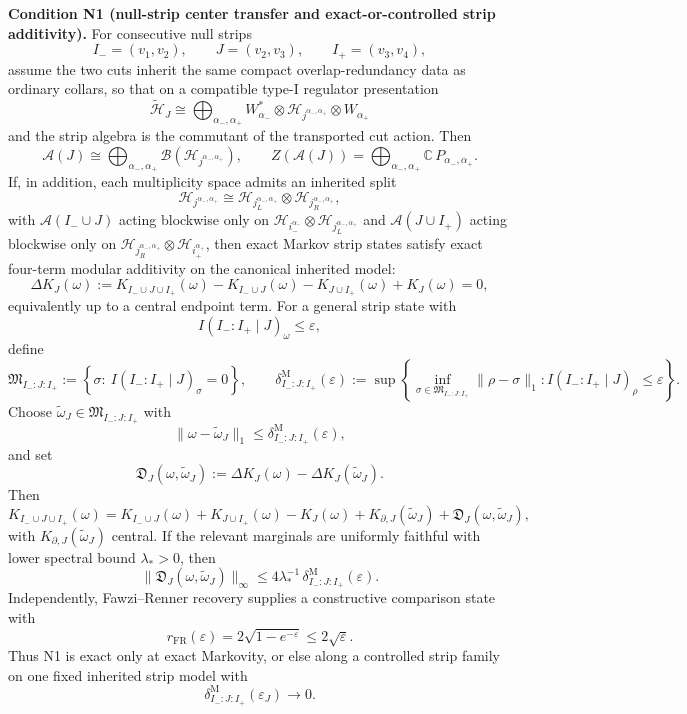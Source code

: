 \textbf{Condition N1 (null-strip center transfer and exact-or-controlled strip additivity).} For consecutive null strips
\[
I_-=(v_1,v_2),\qquad
J=(v_2,v_3),\qquad
I_+=(v_3,v_4),
\]
assume the two cuts inherit the same compact overlap-redundancy data as ordinary collars, so that on a compatible type-I regulator presentation
\[
\tilde{\mathcal H}_{J}
\cong
\bigoplus_{\alpha_-,\alpha_+}
W_{\alpha_-}^{*}\otimes
\mathcal H_{j^{\alpha_-,\alpha_+}}\otimes
W_{\alpha_+}
\]
and the strip algebra is the commutant of the transported cut action. Then
\[
\mathcal A(J)
\cong
\bigoplus_{\alpha_-,\alpha_+}
\mathcal B(\mathcal H_{j^{\alpha_-,\alpha_+}}),
\qquad
Z(\mathcal A(J))
=
\bigoplus_{\alpha_-,\alpha_+}\mathbb C\,P_{\alpha_-,\alpha_+}.
\]
If, in addition, each multiplicity space admits an inherited split
\[
\mathcal H_{j^{\alpha_-,\alpha_+}}
\cong
\mathcal H_{j_L^{\alpha_-,\alpha_+}}
\otimes
\mathcal H_{j_R^{\alpha_-,\alpha_+}},
\]
with \(\mathcal A(I_-\cup J)\) acting blockwise only on
\(\mathcal H_{i_-^{\alpha_-}}\otimes \mathcal H_{j_L^{\alpha_-,\alpha_+}}\)
and \(\mathcal A(J\cup I_+)\) acting blockwise only on
\(\mathcal H_{j_R^{\alpha_-,\alpha_+}}\otimes \mathcal H_{i_+^{\alpha_+}}\),
then exact Markov strip states satisfy exact four-term modular additivity on the canonical inherited model:
\[
\Delta K_J(\omega)
:=
K_{I_-\cup J\cup I_+}(\omega)-K_{I_-\cup J}(\omega)-K_{J\cup I_+}(\omega)+K_J(\omega)
=0,
\]
equivalently up to a central endpoint term. For a general strip state with
\[
I(I_-:I_+\mid J)_\omega\le \varepsilon,
\]
define
\[
\mathfrak M_{I_-:J:I_+}
:=
\left\{
\sigma:\ I(I_-:I_+\mid J)_\sigma=0
\right\},
\qquad
\delta^{\mathrm M}_{I_-:J:I_+}(\varepsilon)
:=
\sup\left\{
\inf_{\sigma\in\mathfrak M_{I_-:J:I_+}}\|\rho-\sigma\|_1:
I(I_-:I_+\mid J)_\rho\le\varepsilon
\right\}.
\]
Choose \(\widetilde\omega_J\in \mathfrak M_{I_-:J:I_+}\) with
\[
\|\omega-\widetilde\omega_J\|_1
\le
\delta^{\mathrm M}_{I_-:J:I_+}(\varepsilon),
\]
and set
\[
\mathfrak D_J(\omega,\widetilde\omega_J)
:=
\Delta K_J(\omega)-\Delta K_J(\widetilde\omega_J).
\]
Then
\[
K_{I_-\cup J\cup I_+}(\omega)
=
K_{I_-\cup J}(\omega)+K_{J\cup I_+}(\omega)-K_J(\omega)
+K_{\partial,J}(\widetilde\omega_J)
+\mathfrak D_J(\omega,\widetilde\omega_J),
\]
with \(K_{\partial,J}(\widetilde\omega_J)\) central. If the relevant marginals are uniformly faithful with lower spectral bound \(\lambda_\ast>0\), then
\[
\|\mathfrak D_J(\omega,\widetilde\omega_J)\|_\infty
\le
4\lambda_\ast^{-1}\,
\delta^{\mathrm M}_{I_-:J:I_+}(\varepsilon).
\]
Independently, Fawzi--Renner recovery supplies a constructive comparison state with
\[
r_{\mathrm{FR}}(\varepsilon)
=
2\sqrt{1-e^{-\varepsilon}}
\le
2\sqrt{\varepsilon}.
\]
Thus N1 is exact only at exact Markovity, or else along a controlled strip family on one fixed inherited strip model with
\[
\delta^{\mathrm M}_{I_-:J:I_+}(\varepsilon_J)\to 0.
\]

